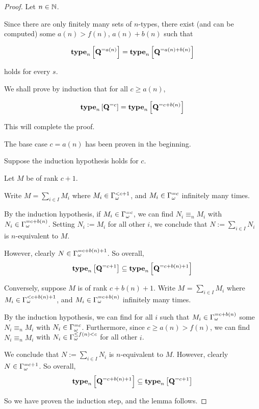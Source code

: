 \begin{proof}
  Let $n \in \mathbb{N}$.

  Since there are only finitely many sets of $n$-types,
  there exist (and can be computed)
  some $a(n) > f(n)$, $a(n) + b(n)$ such that

  \[\mathbf{type}_{n} \left[ {\mathbf{Q}^{= a(n)}} \right] = \mathbf{type}_{n} \left[ {\mathbf{Q}^{= a(n) + b(n)}} \right]\]

  holds for every $s$.

  We shall prove by induction that for all $c \ge a(n)$,

  \[\mathbf{type}_{n} \left[ {\mathbf{Q}^{= c}} \right] = \mathbf{type}_{n} \left[ {\mathbf{Q}^{= c + b(n)}} \right]\]

  This will complete the proof.

  The base case $c = a(n)$ has been proven in the beginning.

  Suppose the induction hypothesis holds for $c$.

  Let $M$ be of rank $c + 1$.

  Write $M = \sum_{i \in I} M_i$ where $M_i \in \Gamma_{\omega}^{< c + 1}$,
  and $M_i \in \Gamma_{\omega}^{= c}$ infinitely many times.

  By the induction hypothesis,
  if $M_i \in \Gamma_{\omega}^{= c}$, we can find $N_i \equiv_n M_i$ with $N_i \in \Gamma_{\omega}^{= c + b(n)}$.
  Setting $N_i := M_i$ for all other $i$, we conclude that $N := \sum_{i \in I} N_i$
  is $n$-equivalent to $M$.

  However, clearly $N \in \Gamma_{\omega}^{= c + b(n) + 1}$. So overall,
  \[\mathbf{type}_{n} \left[ {\mathbf{Q}^{= c + 1}} \right] \subseteq \mathbf{type}_{n} \left[ {\mathbf{Q}^{= c + b(n) + 1}} \right]\]

  Conversely, suppose $M$ is of rank $c + b(n) + 1$.
  Write $M$ = $\sum_{i \in I} M_i$ where $M_i \in \Gamma_{\omega}^{< c + b(n) + 1}$,
  and $M_i \in \Gamma_{\omega}^{= c + b(n)}$ infinitely many times.

  By the induction hypothesis,
  we can find for all $i$ such that $M_i \in \Gamma_{\omega}^{= c + b(n)}$ some
  $N_i \equiv_n M_i$ with $N_i \in \Gamma_{\omega}^{= c}$.
  Furthermore, since $c \ge a(n) > f(n)$, we can
  find $N_i \equiv_n M_i$ with $N_i \in \Gamma_{\omega}^{\le f(n) < c}$ for all other $i$.

  We conclude that $N := \sum_{i \in I} N_i$ is $n$-equivalent to $M$.
  However, clearly $N \in \Gamma_{\omega}^{= c + 1}$. So overall,
  \[\mathbf{type}_{n} \left[ {\mathbf{Q}^{= c + b(n) + 1}} \right] \subseteq \mathbf{type}_{n} \left[ {\mathbf{Q}^{= c + 1}} \right]\]

  So we have proven the induction step, and the lemma follows.
\end{proof}

